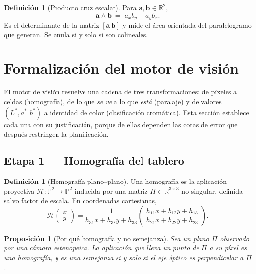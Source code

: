 \documentclass[11pt,a4paper]{article}
\newtheorem{proposicion}[teorema]{Proposición}
\theoremstyle{definition}
\newtheorem{definicion}[teorema]{Definición}
\newcommand{\R}{\mathbb{R}}
\newcommand{\aaa}{\mathbf{a}}
\begin{document}
\begin{definicion}[Producto cruz escalar]
Para $\aaa, \mathbf{b} \in \R^2$,
\begin{equation}
  \aaa \wedge \mathbf{b} \;=\; a_x b_y - a_y b_x .
  \label{eq:cruz}
\end{equation}
Es el determinante de la matriz $[\aaa\ \mathbf{b}]$ y mide el área orientada del
paralelogramo que generan. Se anula si y solo si son colineales.
\end{definicion}

\section{Formalización del motor de visión}
\label{sec:vision}

El motor de visión resuelve una cadena de tres transformaciones: de píxeles a celdas
(homografía), de lo que \emph{se ve} a lo que \emph{está} (paralaje) y de valores
$(L^\ast,a^\ast,b^\ast)$ a identidad de color (clasificación cromática). Esta sección
establece cada una con su justificación, porque de ellas dependen las cotas de error
que después restringen la planificación.

\subsection{Etapa 1 --- Homografía del tablero}

\begin{definicion}[Homografía plano--plano]
Una homografía es la aplicación proyectiva $\mathcal H : \mathbb{P}^2 \to \mathbb{P}^2$
inducida por una matriz $H \in \R^{3\times 3}$ no singular, definida salvo factor de
escala. En coordenadas cartesianas,
\begin{equation}
  \mathcal H\begin{pmatrix}x\\y\end{pmatrix}
  = \frac{1}{h_{31}x + h_{32}y + h_{33}}
    \begin{pmatrix} h_{11}x + h_{12}y + h_{13} \\ h_{21}x + h_{22}y + h_{23}\end{pmatrix}.
  \label{eq:homografia}
\end{equation}
\end{definicion}

\begin{proposicion}[Por qué homografía y no semejanza]
Sea un plano $\Pi$ observado por una cámara estenopeica. La aplicación que lleva un
punto de $\Pi$ a su píxel es una homografía, y es una semejanza si y solo si el eje
óptico es perpendicular a $\Pi$.
\end{proposicion}
\end{document}
